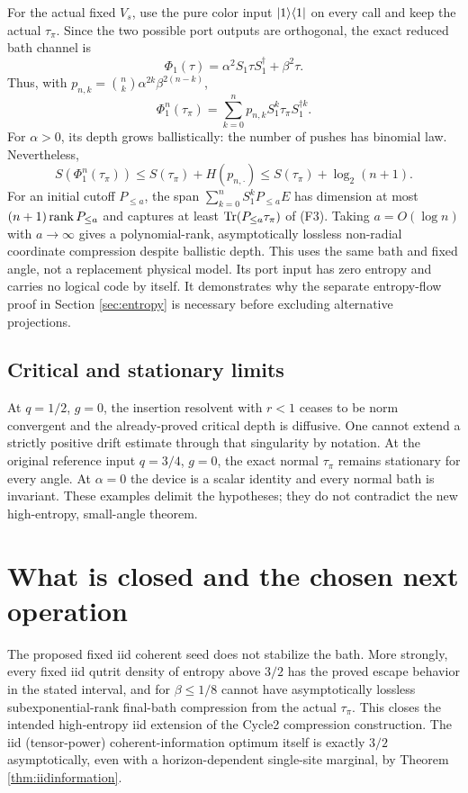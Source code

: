 For the actual fixed $V_s$, use the pure color input $\lvert 1\rangle\langle 1\rvert$
on every call and keep the actual $\tau_\pi$. Since the two possible
port outputs are orthogonal, the exact reduced bath channel is
\[
 \Phi_1(\tau)=\alpha^2S_1\tau S_1^\dagger+\beta^2\tau.
\]
Thus, with $p_{n,k}=\binom nk\alpha^{2k}\beta^{2(n-k)}$,
\[
 \Phi_1^n(\tau_\pi)=
 \sum_{k=0}^n p_{n,k}S_1^k\tau_\pi S_1^{\dagger k}.
 \tag{F3}
\]
For $\alpha>0$, its depth grows ballistically: the number of pushes
has binomial law. Nevertheless,
\[
 S(\Phi_1^n(\tau_\pi))
 \le S(\tau_\pi)+H(p_{n,\cdot})
 \le S(\tau_\pi)+\log_2(n+1).
 \tag{F4}
\]
For an initial cutoff $P_{\le a}$, the span
$\sum_{k=0}^nS_1^kP_{\le a}E$ has dimension at most
$(n+1)\operatorname{rank} P_{\le a}$ and captures at least
$\operatorname{Tr}(P_{\le a}\tau_\pi)$ of (F3).
Taking $a=O(\log n)$ with $a\to\infty$ gives a polynomial-rank,
asymptotically lossless non-radial coordinate compression despite ballistic depth.
This uses the same bath and fixed angle, not a replacement physical model.
Its port input has zero entropy and carries no logical code by itself.
It demonstrates why the separate entropy-flow proof in Section
\ref{sec:entropy} is necessary before excluding alternative projections.

\subsection{Critical and stationary limits}

At $q=1/2$, $g=0$, the insertion resolvent with $r<1$ ceases to be
norm convergent and the already-proved critical depth is diffusive.
One cannot extend a strictly positive drift estimate through that
singularity by notation. At the original reference input
$q=3/4$, $g=0$, the exact normal $\tau_\pi$ remains stationary for
every angle. At $\alpha=0$ the device is a scalar identity and every
normal bath is invariant. These examples delimit the hypotheses;
they do not contradict the new high-entropy, small-angle theorem.

\section{What is closed and the chosen next operation}

The proposed fixed iid coherent seed does not stabilize the bath. More
strongly, every fixed iid qutrit density of entropy above $3/2$ has the
proved escape behavior in the stated interval, and for $\beta\le1/8$
cannot have asymptotically lossless subexponential-rank final-bath
compression from the actual $\tau_\pi$. This closes the intended
high-entropy iid extension of the Cycle2 compression construction.
The iid (tensor-power) coherent-information optimum itself is exactly
$3/2$ asymptotically, even with a horizon-dependent single-site marginal,
by Theorem \ref{thm:iidinformation}.

